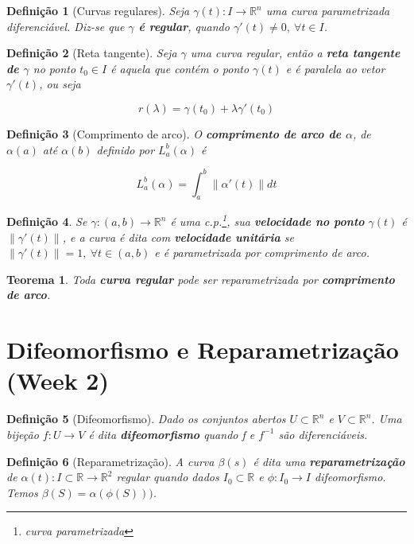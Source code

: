 \documentclass{article}
\newtheorem{theorem}{Teorema}
\newtheorem{definition}{Definição}
\begin{document}
\begin{definition}[Curvas regulares]
Seja $\gamma (t): I \rightarrow \mathbb{R}^n$ uma curva parametrizada diferenciável. Diz-se que \textbf{$\gamma$ é regular}, quando $\gamma'(t) \neq 0,\ \forall t \in I$. 
\end{definition}

\begin{definition}[Reta tangente]
Seja $\gamma$ uma curva regular, então a \textbf{reta tangente de $\gamma$} no ponto $t_0 \in I$ é aquela que contém o ponto $\gamma(t)$ e é paralela ao vetor $\gamma'(t)$, ou seja

$$r(\lambda) = \gamma(t_0) + \lambda \gamma'(t_0)$$
\end{definition}

\begin{definition}[Comprimento de arco]
O \textbf{comprimento de arco de $\alpha$}, de $\alpha(a)$ até $\alpha(b)$ definido por $L_a^b (\alpha)$ é  

$$L_a^b (\alpha) = \int_a^b \| \alpha'(t) \| d t$$
\end{definition}

\begin{definition}
Se $\gamma: (a, b) \rightarrow \mathbb{R}^n$ é uma c.p.\footnote{curva parametrizada}, sua \textbf{velocidade no ponto} $\gamma(t)$ é $\| \gamma'(t) \|$, e a curva é dita com \textbf{velocidade unitária} se $\| \gamma'(t) \| = 1,\ \forall t \in (a, b)$ e é parametrizada por comprimento de arco.
\end{definition}

\begin{theorem}
Toda \textbf{curva regular} pode ser reparametrizada por \textbf{comprimento de arco}.
\end{theorem}

\section*{Difeomorfismo e Reparametrização (Week 2)}
\label{s2}

\begin{definition}[Difeomorfismo]
Dado os conjuntos abertos $U \subset \mathbb{R}^n$ e $V \subset \mathbb{R}^n$. Uma bijeção $f: U \rightarrow V$ é dita \textbf{difeomorfismo} quando f e $f^{-1}$ são diferenciáveis.
\end{definition}

\begin{definition}[Reparametrização]
A curva $\beta(s)$ é dita uma \textbf{reparametrização} de $\alpha(t): I \subset \mathbb{R} \rightarrow \mathbb{R}^2$ regular quando dados $I_0 \subset \mathbb{R}$ e $\phi: I_0 \rightarrow I$ difeomorfismo. Temos $\beta(S) = \alpha(\phi(S)))$.
\end{definition}
\end{document}
